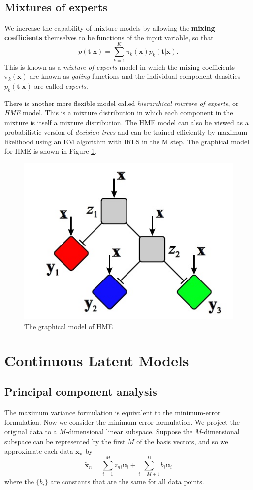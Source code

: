\documentclass[a4paper]{report}
\renewcommand{\bf}{\mathbf}
\newcommand{\imp}[1]{{\color{blue}\textit{#1}}}
\begin{document}
\subsection{Mixtures of experts}
We increase the capability of mixture models by allowing the \textbf{mixing coefficients} themselves to be functions of the input variable, so that
\begin{equation}
	p(\bf{t|x}) = \sum_{k=1}^K \pi_k(\bf{x})p_k(\bf{t|x}).
\end{equation}
This is known as a \imp{mixture of experts} model in which the mixing coefficients $\pi_k(\bf{x})$ are known as \imp{gating} functions and the individual component densities $p_k(\bf{t|x})$ are called \imp{experts}.

There is another more flexible model called \imp{hierarchical mixture of experts}, or \imp{HME} model. This is a mixture distribution in which each component in the mixture is itself a mixture distribution. The HME model can also be viewed as a probabilistic version of \imp{decision trees} and can be trained efficiently by maximum likelihood using an EM algorithm with IRLS in the M step. The graphical model for HME is shown in Figure \ref{HME}.
\begin{figure}
\centering
\includegraphics[scale = 0.5]{HME}
\caption{The graphical model of HME}\label{HME}
\end{figure}
\section{Continuous Latent Models}
\subsection{Principal component analysis}
The maximum variance formulation is equivalent to the minimum-error formulation. Now we consider the minimum-error formulation. We project the original data to a $M$-dimensional linear subspace. Suppose the $M$-dimensional subspace can be represented by the first $M$ of the basis vectors, and so we approximate each data $\bf{x}_n$ by
\begin{equation}
	\tilde{\bf{x}}_{n} = \sum_{i=1}^M z_{ni}\bf{u}_i  + \sum_{i=M+1}^D b_i \bf{u}_i
\end{equation}
where the $\{b_i \}$ are constants that are the same for all data points.
\end{document}
